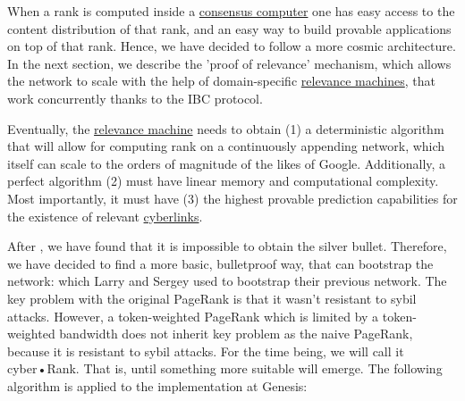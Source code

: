 \documentclass[8pt,oneside]{amsart}
\newcommand{\linkred}[2]{\href{#1}{\color{red}{#2}}}
\begin{document}
When a rank is computed inside a {\hyperref[consensus-computer]{consensus computer}} one has easy access to the content distribution of that rank, and an easy way to build provable applications on top of that rank. Hence, we have decided to follow a more cosmic architecture. In the next section, we describe the 'proof of relevance' mechanism, which allows the network to scale with the help of domain-specific {\hyperref[relevance-machine]{relevance machines}}, that work concurrently thanks to the IBC protocol.

Eventually, the {\hyperref[relevance-machine]{relevance machine}} needs to obtain (1) a deterministic algorithm that will allow for computing rank on a continuously appending network, which itself can scale to the orders of magnitude of the likes of Google. Additionally, a perfect algorithm (2) must have linear memory and computational complexity. Most importantly, it must have (3) the highest provable prediction capabilities for the existence of relevant {\hyperref[cyberlinks]{cyberlinks}}.

After \linkred{https://arxiv.org/pdf/1709.09002.pdf}{some research}, we have found that it is impossible to obtain the silver bullet. Therefore, we have decided to find a more basic, bulletproof way, that can bootstrap the network: \linkred{http://ilpubs.stanford.edu:8090/422/1/1999-66.pdf}{the rank} which Larry and Sergey used to bootstrap their previous network. The key problem with the original PageRank is that it wasn't resistant to sybil attacks. However, a token-weighted PageRank which is limited by a token-weighted bandwidth does not inherit key problem as the naive PageRank, because it is resistant to sybil attacks. For the time being, we will call it cyber•Rank. That is, until something more suitable will emerge. The following algorithm is applied to the implementation at Genesis:
\end{document}
